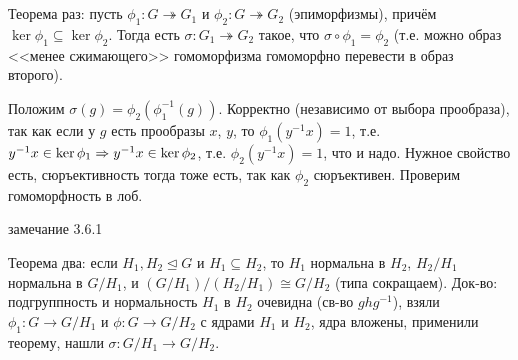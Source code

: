 \section{} %
Теорема раз:
пусть $\phi_1 \colon G \twoheadrightarrow G_1$ и
$\phi_2 \colon G \twoheadrightarrow G_2$ (эпиморфизмы),
причём $\ker \phi_1 \subseteq \ker \phi_2$.
Тогда есть $\sigma \colon G_1 \twoheadrightarrow G_2$ такое, что $\sigma \circ \phi_1 = \phi_2$
(т.е. можно образ <<менее сжимающего>> гомоморфизма гомоморфно перевести в образ второго).

Положим $\sigma(g) = \phi_2(\phi_1^{-1}(g))$.
Корректно (независимо от выбора прообраза), так как если у $g$ есть прообразы $x$, $y$,
то $\phi_1(y^{-1}x)=1$, т.е. $y^{-1}x \in \ker \phi_1 \Rightarrow y^{-1}x \in \ker \phi_2$,
т.е. $\phi_2(y^{-1}x)=1$, что и надо.
Нужное свойство есть, сюръективность тогда тоже есть, так как $\phi_2$ сюръективен.
Проверим гомоморфность в лоб.

\TODO замечание 3.6.1

Теорема два: если $H_1, H_2 \unlhd G$ и $H_1 \subseteq H_2$, то	$H_1$ нормальна в $H_2$,
$H_2 / H_1$ нормальна в $G/H_1$, и $(G/H_1)/(H_2/H_1)\cong G/H_2$ (типа сокращаем).
Док-во: подгруппность и нормальность $H_1$ в $H_2$ очевидна (св-во $ghg^{-1}$),
взяли $\phi_1 \colon G \to G/H_1$ и $\phi \colon G \to G/H_2$ с ядрами $H_1$ и $H_2$,
ядра вложены, применили теорему, нашли $\sigma \colon G/H_1 \to G/H_2$.
